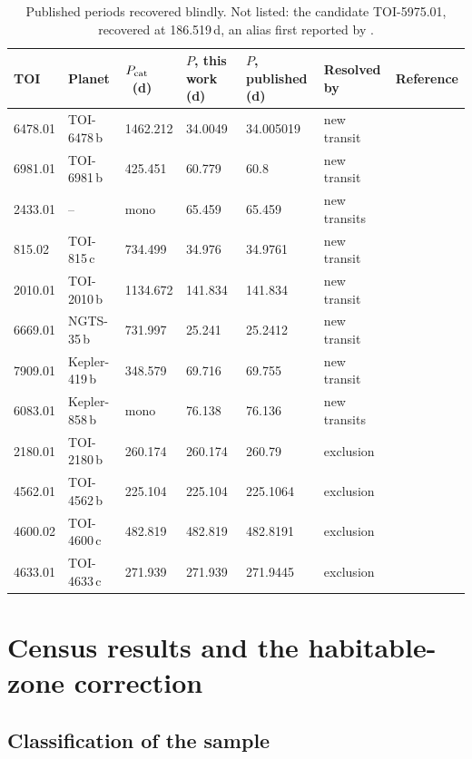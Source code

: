\documentclass[fleqn,usenatbib]{mnras}
\newcommand{\Pcat}{\ensuremath{P_{\rm cat}}}
\begin{document}
\begin{table}
\centering
\caption{Published periods recovered blindly. Not listed: the candidate TOI-5975.01, recovered at 186.519\,d, an alias first reported by \citet{Bass2025}.}
\label{tab:published}
\begin{tabular}{lllllll}
\toprule
TOI & Planet & \Pcat\ (d) & $P$, this work (d) & $P$, published (d) & Resolved by & Reference \\
\midrule
6478.01 & TOI-6478\,b & 1462.212 & 34.0049 & 34.005019 & new transit & \citet{ScottM2025} \\
6981.01 & TOI-6981\,b & 425.451 & 60.779 & 60.8 & new transit & \citet{ScottM2026} \\
2433.01 & -- & mono & 65.459 & 65.459 & new transits & \citet{Tschudi2026b} \\
815.02 & TOI-815\,c & 734.499 & 34.976 & 34.9761 & new transit & \citet{Psaridi2024} \\
2010.01 & TOI-2010\,b & 1134.672 & 141.834 & 141.834 & new transit & \citet{Mann2023} \\
6669.01 & NGTS-35\,b & 731.997 & 25.241 & 25.2412 & new transit & \citet{Kendall2026} \\
7909.01 & Kepler-419\,b & 348.579 & 69.716 & 69.755 & new transit & \citet{Dawson2014} \\
6083.01 & Kepler-858\,b & mono & 76.138 & 76.136 & new transits & \citet{Morton2016} \\
2180.01 & TOI-2180\,b & 260.174 & 260.174 & 260.79 & exclusion & \citet{Dalba2022} \\
4562.01 & TOI-4562\,b & 225.104 & 225.104 & 225.1064 & exclusion & \citet{Heitzmann2023} \\
4600.02 & TOI-4600\,c & 482.819 & 482.819 & 482.8191 & exclusion & \citet{Mireles2023} \\
4633.01 & TOI-4633\,c & 271.939 & 271.939 & 271.9445 & exclusion & \citet{Eisner2024} \\
\bottomrule
\end{tabular}
\end{table}

\section{Census results and the habitable-zone correction}
\label{sec:census}

\subsection{Classification of the sample}
\end{document}
